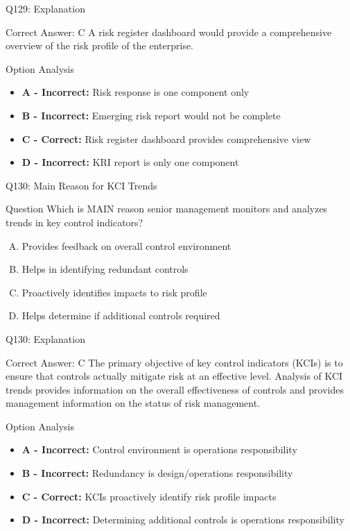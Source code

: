 \documentclass{beamer}
\begin{document}
	\begin{frame}{Q129: Explanation}
		\begin{block}{Correct Answer: C}
			A risk register dashboard would provide a comprehensive overview of the risk profile of the enterprise.
		\end{block}
		\begin{block}{Option Analysis}
			\begin{itemize}
				\item \textbf{A - Incorrect:} Risk response is one component only
				\item \textbf{B - Incorrect:} Emerging risk report would not be complete
				\item \textbf{C - Correct:} Risk register dashboard provides comprehensive view
				\item \textbf{D - Incorrect:} KRI report is only one component
			\end{itemize}
		\end{block}
	\end{frame}
	
	\begin{frame}{Q130: Main Reason for KCI Trends}
		\begin{block}{Question}
			Which is MAIN reason senior management monitors and analyzes trends in key control indicators?
		\end{block}
		\begin{enumerate}[(A)]
			\item Provides feedback on overall control environment
			\item Helps in identifying redundant controls
			\item Proactively identifies impacts to risk profile
			\item Helps determine if additional controls required
		\end{enumerate}
	\end{frame}
	
	\begin{frame}{Q130: Explanation}
		\begin{block}{Correct Answer: C}
			The primary objective of key control indicators (KCIs) is to ensure that controls actually mitigate risk at an effective level. Analysis of KCI trends provides information on the overall effectiveness of controls and provides management information on the status of risk management.
		\end{block}
		\begin{block}{Option Analysis}
			\begin{itemize}
				\item \textbf{A - Incorrect:} Control environment is operations responsibility
				\item \textbf{B - Incorrect:} Redundancy is design/operations responsibility
				\item \textbf{C - Correct:} KCIs proactively identify risk profile impacts
				\item \textbf{D - Incorrect:} Determining additional controls is operations responsibility
			\end{itemize}
		\end{block}
	\end{frame}
	
\end{document}
